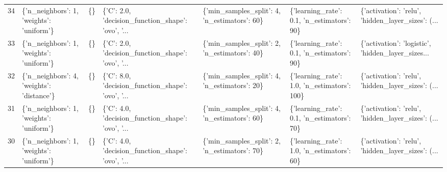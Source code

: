 \begin{tabular}{lllllll}
34  &   \{'n\_neighbors': 1, 'weights': 'uniform'\} &  \{\} &  \{'C': 2.0, 'decision\_function\_shape': 'ovo', '... &   \{'min\_samples\_split': 4, 'n\_estimators': 60\} &   \{'learning\_rate': 0.1, 'n\_estimators': 90\} &  \{'activation': 'relu', 'hidden\_layer\_sizes': (... \\
33  &   \{'n\_neighbors': 1, 'weights': 'uniform'\} &  \{\} &  \{'C': 2.0, 'decision\_function\_shape': 'ovo', '... &   \{'min\_samples\_split': 2, 'n\_estimators': 40\} &   \{'learning\_rate': 0.1, 'n\_estimators': 90\} &  \{'activation': 'logistic', 'hidden\_layer\_sizes... \\
32  &  \{'n\_neighbors': 4, 'weights': 'distance'\} &  \{\} &  \{'C': 8.0, 'decision\_function\_shape': 'ovo', '... &   \{'min\_samples\_split': 4, 'n\_estimators': 20\} &  \{'learning\_rate': 1.0, 'n\_estimators': 100\} &  \{'activation': 'relu', 'hidden\_layer\_sizes': (... \\
31  &   \{'n\_neighbors': 1, 'weights': 'uniform'\} &  \{\} &  \{'C': 4.0, 'decision\_function\_shape': 'ovo', '... &   \{'min\_samples\_split': 4, 'n\_estimators': 60\} &   \{'learning\_rate': 0.1, 'n\_estimators': 70\} &  \{'activation': 'relu', 'hidden\_layer\_sizes': (... \\
30  &   \{'n\_neighbors': 1, 'weights': 'uniform'\} &  \{\} &  \{'C': 4.0, 'decision\_function\_shape': 'ovo', '... &   \{'min\_samples\_split': 2, 'n\_estimators': 70\} &   \{'learning\_rate': 1.0, 'n\_estimators': 60\} &  \{'activation': 'relu', 'hidden\_layer\_sizes': (... \\
\bottomrule
\end{tabular}
